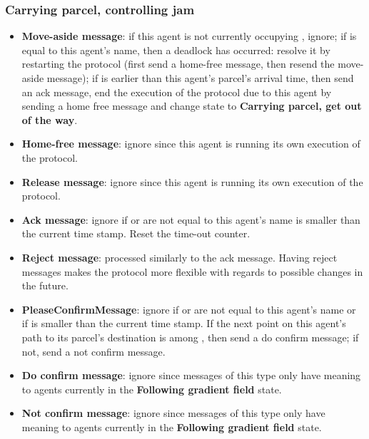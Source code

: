 \subsubsection*{Carrying parcel, controlling jam}
\begin{itemize}
    \item \textbf{Move-aside message}: if this agent is not currently occupying , ignore; if  is equal to this agent's name, then a deadlock has occurred: resolve it by restarting the protocol (first send a home-free message, then resend the move-aside message); if  is earlier than this agent's parcel's arrival time, then send an ack message, end the execution of the protocol due to this agent by sending a home free message and change state to \textbf{Carrying parcel, get out of the way}.
    \item \textbf{Home-free message}: ignore since this agent is running its own execution of the protocol.
    \item \textbf{Release message}: ignore since this agent is running its own execution of the protocol.
    \item \textbf{Ack message}: ignore if  or  are not equal to this agent's name  is smaller than the current time stamp. Reset the time-out counter.
    \item \textbf{Reject message}: processed similarly to the ack message. Having reject messages makes the protocol more flexible with regards to possible changes in the future.
    \item \textbf{PleaseConfirmMessage}: ignore if  or  are not equal to this agent's name or if  is smaller than the current time stamp. If the next point on this agent's path to its parcel's destination is among , then send a do confirm message; if not, send a not confirm message.
    \item \textbf{Do confirm message}: ignore since messages of this type only have meaning to agents currently in the \textbf{Following gradient field} state.
    \item \textbf{Not confirm message}: ignore since messages of this type only have meaning to agents currently in the \textbf{Following gradient field} state.
\end{itemize}

